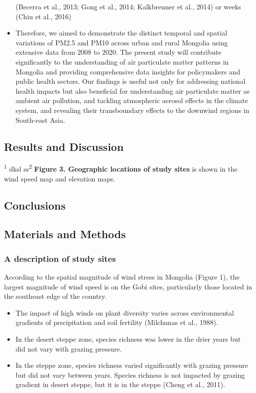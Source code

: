 \documentclass[
  11pt,
]{article}
\providecommand{\tightlist}{%
  \setlength{\itemsep}{0pt}\setlength{\parskip}{0pt}}
\begin{document}
\begin{itemize}
  (Becerra et al., 2013; Gong et al., 2014; Kalkbrenner et al., 2014) or
  weeks (Chiu et al., 2016)
\item
  Therefore, we aimed to demonstrate the distinct temporal and spatial
  variations of PM2.5 and PM10 across urban and rural Mongolia using
  extensive data from 2008 to 2020. The present study will contribute
  significantly to the understanding of air particulate matter patterns
  in Mongolia and providing comprehensive data insights for policymakers
  and public health sectors. Our findings is useful not only for
  addressing national health impacts but also beneficial for
  understanding air particulate matter as ambient air pollution, and
  tackling atmospheric aerosol effects in the climate system, and
  revealing their transboundary effects to the downwind regions in
  South-east Asia. \newpage
\end{itemize}

\subsection{Results and Discussion}\label{results-and-discussion}

\textsuperscript{1} dksl ss\textsuperscript{2} \textbf{Figure 3.
Geographic locations of study sites} is shown in the wind speed map and
elevation maps.

\newpage

\subsection{Conclusions}\label{conclusions}

\newpage

\subsection{Materials and Methods}\label{materials-and-methods}

\subsubsection{A description of study
sites}\label{a-description-of-study-sites}

According to the spatial magnitude of wind stress in Mongolia (Figure
1), the largest magnitude of wind speed is on the Gobi sites,
particularly those located in the southeast edge of the country.

\begin{itemize}
\tightlist
\item
  The impact of high winds on plant diversity varies across
  environmental gradients of precipitation and soil fertility (Milchunas
  et al., 1988).
\item
  In the desert steppe zone, species richness was lower in the drier
  years but did not vary with grazing pressure.
\item
  In the steppe zone, species richness varied significantly with grazing
  pressure but did not vary between years. Species richness is not
  impacted by grazing gradient in desert steppe, but it is in the steppe
  (Cheng et al., 2011).
\end{itemize}
\end{document}
